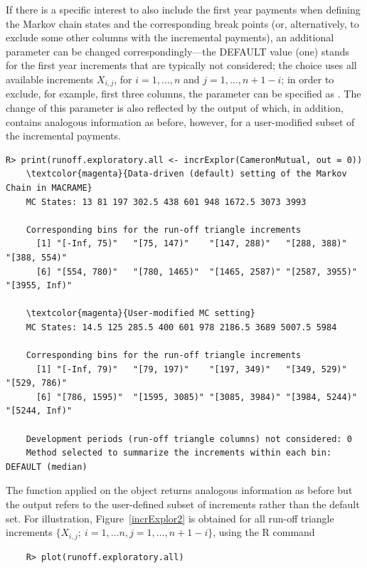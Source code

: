 If there is a specific interest to also include the first year payments when defining the Markov chain states and the corresponding break points (or, alternatively, to exclude some other columns with the incremental payments), an additional parameter  can be changed correspondingly---the DEFAULT  value (one) stands for the first year increments 
that are typically not considered; the choice  uses all available increments $X_{i,j}$, for $i = 1, \dots, n$ and $j = 1, \dots, n + 1 - i$; in order to exclude, for example, first three columns, the parameter can be specified as .  The change of this parameter is also reflected by the output of  which, in addition, contains analogous information as before, however, for a user-modified subset of the incremental payments. 
\begin{Verbatim}[commandchars=\\\{\}]
    R> print(runoff.exploratory.all <- incrExplor(CameronMutual, out = 0))
    \textcolor{magenta}{Data-driven (default) setting of the Markov Chain in MACRAME}
    MC States: 13 81 197 302.5 438 601 948 1672.5 3073 3993

    Corresponding bins for the run-off triangle increments
      [1] "[-Inf, 75)"   "[75, 147)"    "[147, 288)"   "[288, 388)"   "[388, 554)"   
      [6] "[554, 780)"   "[780, 1465)"  "[1465, 2587)" "[2587, 3955)" "[3955, Inf)" 

    \textcolor{magenta}{User-modified MC setting}
    MC States: 14.5 125 285.5 400 601 978 2186.5 3689 5007.5 5984

    Corresponding bins for the run-off triangle increments
      [1] "[-Inf, 79)"   "[79, 197)"    "[197, 349)"   "[349, 529)"   "[529, 786)"   
      [6] "[786, 1595)"  "[1595, 3085)" "[3085, 3984)" "[3984, 5244)" "[5244, Inf)" 

    Development periods (run-off triangle columns) not considered: 0
    Method selected to summarize the increments within each bin: DEFAULT (median)
\end{Verbatim}
The  function applied on the   object returns analogous information as before but the output  refers to the user-defined subset of increments rather than the default set.  For illustration, Figure~\ref{incrExplor2} is obtained for all run-off triangle increments $\{X_{i,j};~i = 1, \dots n, j = 1, \dots, n + 1 - i\}$, using the R command
\begin{verbatim}
    R> plot(runoff.exploratory.all)
\end{verbatim}


